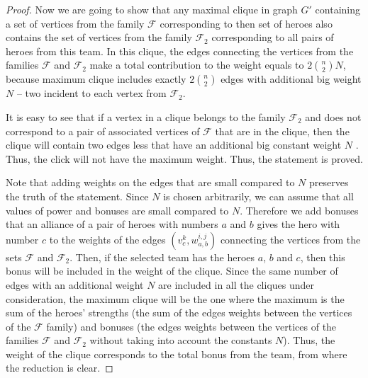 \documentclass{article}
\begin{document}
\begin{proof}
    Now we are going to show that any maximal clique in graph $G'$ containing a set of vertices from the family $\mathcal{F}$ corresponding to then set of heroes also contains the set of vertices from the family $\mathcal {F}_2$ corresponding to all pairs of heroes from this team. In this clique, the edges connecting the vertices from the families $\mathcal{F}$ and $ \mathcal {F}_2$ make a total contribution to the weight equals to $2 \binom{n}{2} N$, because maximum clique includes exactly $2 \binom {n} {2}$ edges with additional big weight $N$ -- two incident to each vertex from $\mathcal {F}_2$.
    
    	It is easy to see that if a vertex in a clique belongs to the family $\mathcal{F}_2 $ and does not correspond to a pair of associated vertices of $ \mathcal {F} $ that are in the clique, then the clique will contain two edges less that have an additional big constant weight $N$ . Thus, the click will not have the maximum weight. Thus, the statement is proved.
    	
    	 Note that adding weights on the edges that are small compared to $ N $ preserves the truth of the statement. Since $ N $ is chosen arbitrarily, we can assume that all values of power and bonuses are small compared to $ N $. Therefore we add bonuses that an alliance of a pair of heroes with numbers $ a $ and $ b $ gives the hero with number $ c $ to the weights of the edges  $ (v_c^{k}, w_{a, b}^{i, j}) $ connecting the vertices from the sets $\mathcal {F}$ and $\mathcal {F}_2$. Then, if the selected team has the heroes $a$, $b$ and $c$, then this bonus will be included in the weight of the clique. Since the same number of edges with an additional weight $ N$ are included in all the cliques under consideration, the maximum clique will be the one where the maximum is the sum of the heroes' strengths (the sum of the edges weights between the vertices of the $\mathcal {F} $ family) and bonuses (the edges weights between the vertices of the families $\mathcal{F}$ and $\mathcal {F}_2$ without taking into account the constants $N$). Thus, the weight of the clique corresponds to the total bonus from the team, from where the reduction is clear.
    
\end{proof}

\end{document}
